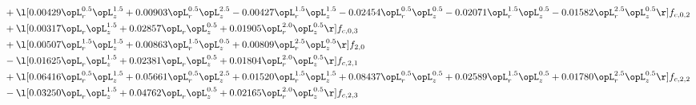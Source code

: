 \begin{alignat}{2}
& + \l[  0.00429 \opL_r^{0.5} \opL_z^{1.5} +  0.00903 \opL_r^{0.5} \opL_z^{2.5}   -0.00427 \opL_r^{1.5} \opL_z^{1.5}   -0.02454 \opL_r^{0.5} \opL_z^{0.5}   -0.02071 \opL_r^{1.5} \opL_z^{0.5}   -0.01582 \opL_r^{2.5} \opL_z^{0.5}  \r] f_{c,0,2} \nonumber \\ 
& + \l[  0.00317 \opL_r \opL_z^{1.5} +  0.02857 \opL_r \opL_z^{0.5} +  0.01905 \opL_r^{2.0} \opL_z^{0.5}  \r] f_{c,0,3} \nonumber \\ 
& + \l[  0.00507 \opL_r^{1.5} \opL_z^{1.5} +  0.00863 \opL_r^{1.5} \opL_z^{0.5} +  0.00809 \opL_r^{2.5} \opL_z^{0.5}  \r] f_{2,0} \nonumber \\ 
& - \l[  0.01625 \opL_r \opL_z^{1.5} +  0.02381 \opL_r \opL_z^{0.5} +  0.01804 \opL_r^{2.0} \opL_z^{0.5}  \r] f_{c,2,1} \nonumber \\ 
& + \l[  0.06416 \opL_r^{0.5} \opL_z^{1.5} +  0.05661 \opL_r^{0.5} \opL_z^{2.5} +  0.01520 \opL_r^{1.5} \opL_z^{1.5} +  0.08437 \opL_r^{0.5} \opL_z^{0.5} +  0.02589 \opL_r^{1.5} \opL_z^{0.5} +  0.01780 \opL_r^{2.5} \opL_z^{0.5}  \r] f_{c,2,2} \nonumber \\ 
& - \l[  0.03250 \opL_r \opL_z^{1.5} +  0.04762 \opL_r \opL_z^{0.5} +  0.02165 \opL_r^{2.0} \opL_z^{0.5}  \r] f_{c,2,3} \nonumber \\ 
\end{alignat} 


